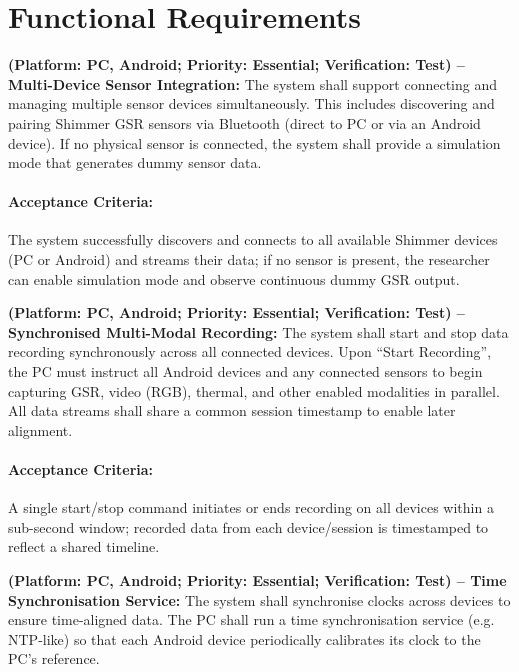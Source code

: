 \section{Functional Requirements}

\begin{description}[style=unboxed,leftmargin=0cm]
	\item[\textbf{FR1}] \textbf{(Platform: PC, Android; Priority: Essential; Verification: Test) – Multi-Device Sensor Integration:} The system shall support connecting and managing multiple sensor devices simultaneously. This includes discovering and pairing Shimmer GSR sensors via Bluetooth (direct to PC or via an Android device). If no physical sensor is connected, the system shall provide a simulation mode that generates dummy sensor data.

	      \paragraph{Acceptance Criteria:} The system successfully discovers and connects to all available Shimmer devices (PC or Android) and streams their data; if no sensor is present, the researcher can enable simulation mode and observe continuous dummy GSR output.

	\item[\textbf{FR2}] \textbf{(Platform: PC, Android; Priority: Essential; Verification: Test) – Synchronised Multi-Modal Recording:} The system shall start and stop data recording synchronously across all connected devices. Upon “Start Recording”, the PC must instruct all Android devices and any connected sensors to begin capturing GSR, video (RGB), thermal, and other enabled modalities in parallel. All data streams shall share a common session timestamp to enable later alignment.

	      \paragraph{Acceptance Criteria:} A single start/stop command initiates or ends recording on all devices within a sub-second window; recorded data from each device/session is timestamped to reflect a shared timeline.

	\item[\textbf{FR3}] \textbf{(Platform: PC, Android; Priority: Essential; Verification: Test) – Time Synchronisation Service:} The system shall synchronise clocks across devices to ensure time-aligned data. The PC shall run a time synchronisation service (e.g. NTP-like) so that each Android device periodically calibrates its clock to the PC’s reference.


\end{description}
